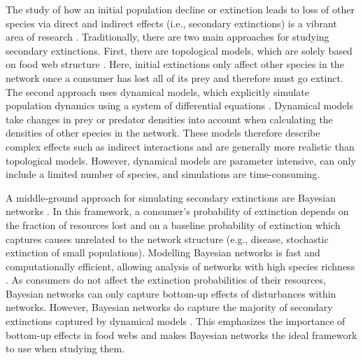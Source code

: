 \documentclass[12pt]{article}
\begin{document}
\begin{spacing}{2.0}
    The study of how an initial population decline or extinction leads to loss of other species via direct and indirect effects (i.e., secondary extinctions) is a vibrant area of research \citep{curtsdotter2011robustness, dunne2009cascading, Eklof2006}. Traditionally, there are two main approaches for studying secondary extinctions. First, there are topological models, which are solely based on food web structure \citep{dunne2009cascading}. Here, initial extinctions only affect other species in the network once a consumer has lost all of its prey and therefore must go extinct. The second approach uses dynamical models, which explicitly simulate population dynamics using a system of differential equations \citep{binzer2011susceptibility}. Dynamical models take changes in prey or predator densities into account when calculating the densities of other species in the network. These models therefore describe complex effects such as indirect interactions and are generally more realistic than topological models. However, dynamical models are parameter intensive, can only include a limited number of species, and simulations are time-consuming. 
    
    
    A middle‐ground approach for simulating secondary extinctions are Bayesian networks \citep{Eklof2013}. In this framework, a consumer's probability of extinction depends on the fraction of resources lost and on a baseline probability of extinction which captures causes unrelated to the network structure (e.g., disease, stochastic extinction of small populations). Modelling Bayesian networks is fast and computationally efficient, allowing analysis of networks with high species richness \citep{Haussler2020}. 
    As consumers do not affect the extinction probabilities of their resources, Bayesian networks can only capture bottom-up effects of disturbances within networks. However, Bayesian networks do capture the majority of secondary extinctions captured by dynamical models \citep{Eklof2013}.
    This emphasizes the importance of bottom-up effects in food webs and makes Bayesian networks the ideal framework to use when studying them.  


\end{spacing}
\end{document}

